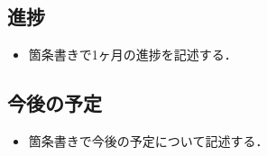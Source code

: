 \documentclass[dvipdfmx]{doc}
\begin{document}
\subsection*{進捗}
\begin{itemize}
    \item 箇条書きで1ヶ月の進捗を記述する．
\end{itemize}

\subsection*{今後の予定}
\begin{itemize}
    \item 箇条書きで今後の予定について記述する．
\end{itemize}
\end{document}
